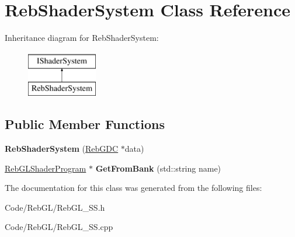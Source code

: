 \hypertarget{class_reb_shader_system}{}\section{Reb\+Shader\+System Class Reference}
\label{class_reb_shader_system}
Inheritance diagram for Reb\+Shader\+System\+:\begin{figure}[H]
\begin{center}
\leavevmode
\includegraphics[height=2.000000cm]{class_reb_shader_system}
\end{center}
\end{figure}
\subsection*{Public Member Functions}
\begin{DoxyCompactItemize}
\item 
{\bfseries Reb\+Shader\+System} (\hyperlink{class_reb_g_d_c}{Reb\+G\+DC} $\ast$data)\hypertarget{class_reb_shader_system_ab5dc9e93efc379ce4b41a50f7d0f9ec7}{}\label{class_reb_shader_system_ab5dc9e93efc379ce4b41a50f7d0f9ec7}

\item 
\hyperlink{class_reb_g_l_shader_program}{Reb\+G\+L\+Shader\+Program} $\ast$ {\bfseries Get\+From\+Bank} (std\+::string name)\hypertarget{class_reb_shader_system_a86bb07f81044d2695b7088126303a258}{}\label{class_reb_shader_system_a86bb07f81044d2695b7088126303a258}

\end{DoxyCompactItemize}


The documentation for this class was generated from the following files\+:\begin{DoxyCompactItemize}
\item 
Code/\+Reb\+G\+L/Reb\+G\+L\+\_\+\+S\+S.\+h\item 
Code/\+Reb\+G\+L/Reb\+G\+L\+\_\+\+S\+S.\+cpp\end{DoxyCompactItemize}
